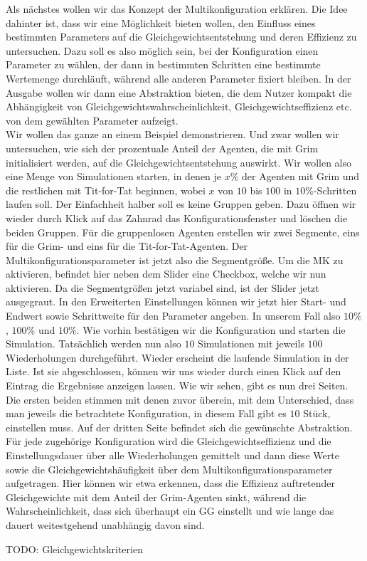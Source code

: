 \documentclass[parskip=full,11pt]{scrartcl}
\begin{document}
Als nächstes wollen wir das Konzept der Multikonfiguration erklären. Die Idee dahinter ist, dass wir eine Möglichkeit bieten wollen, den Einfluss eines bestimmten Parameters auf die Gleichgewichtsentstehung und deren Effizienz zu untersuchen. Dazu soll es also möglich sein, bei der Konfiguration einen Parameter zu wählen, der dann in bestimmten Schritten eine bestimmte Wertemenge durchläuft, während alle anderen Parameter fixiert bleiben. In der Ausgabe wollen wir dann eine Abstraktion bieten, die dem Nutzer kompakt die Abhängigkeit von Gleichgewichtswahrscheinlichkeit, Gleichgewichtseffizienz etc. von dem gewählten Parameter aufzeigt.\\
Wir wollen das ganze an einem Beispiel demonstrieren. Und zwar wollen wir untersuchen, wie sich der prozentuale Anteil der Agenten, die mit Grim initialisiert werden, auf die Gleichgewichtsentstehung auswirkt. Wir wollen also eine Menge von Simulationen starten, in denen je \(x\%\) der Agenten mit Grim und die restlichen mit Tit-for-Tat beginnen, wobei \(x\) von \(10\) bis \(100\) in \(10\%\)-Schritten laufen soll. Der Einfachheit halber soll es keine Gruppen geben. Dazu öffnen wir wieder durch Klick auf das Zahnrad das Konfigurationsfenster und löschen die beiden Gruppen. Für die gruppenlosen Agenten erstellen wir zwei Segmente, eins für die Grim- und eins für die Tit-for-Tat-Agenten. Der Multikonfigurationsparameter ist jetzt also die Segmentgröße. Um die MK zu aktivieren, befindet hier neben dem Slider eine Checkbox, welche wir nun aktivieren. Da die Segmentgrößen jetzt variabel sind, ist der Slider jetzt ausgegraut. In den Erweiterten Einstellungen können wir jetzt hier Start- und Endwert sowie Schrittweite für den Parameter angeben. In unserem Fall also \(10\%\), \(100\%\) und \(10\%\). Wie vorhin bestätigen wir die Konfiguration und starten die Simulation. Tatsächlich werden nun also \(10\) Simulationen mit jeweils \(100\) Wiederholungen durchgeführt. Wieder erscheint die laufende Simulation in der Liste. Ist sie abgeschlossen, können wir uns wieder durch einen Klick auf den Eintrag die Ergebnisse anzeigen lassen. Wie wir sehen, gibt es nun drei Seiten. Die ersten beiden stimmen mit denen zuvor überein, mit dem Unterschied, dass man jeweils die betrachtete Konfiguration, in diesem Fall gibt es \(10\) Stück, einstellen muss. Auf der dritten Seite befindet sich die gewünschte Abstraktion. Für jede zugehörige Konfiguration wird die Gleichgewichtseffizienz und die Einstellungsdauer über alle Wiederholungen gemittelt und dann diese Werte sowie die Gleichgewichtshäufigkeit über dem Multikonfigurationsparameter aufgetragen. Hier können wir etwa erkennen, dass die Effizienz auftretender Gleichgewichte mit dem Anteil der Grim-Agenten sinkt, während die Wahrscheinlichkeit, dass sich überhaupt ein GG einstellt und wie lange das dauert weitestgehend unabhängig davon sind.


TODO: Gleichgewichtskriterien
\end{document}
